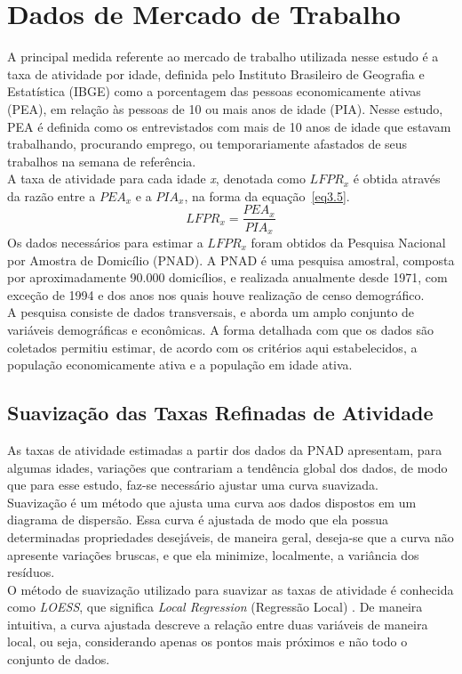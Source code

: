 \documentclass[12pt, 						%
			openright, 					%
			twoside,					%
			a4paper,x					%
			english,					%
			brazil]{abntex2}				%
\begin{document}
 	\section{Dados de Mercado de Trabalho \label{sec3.2}}
	A principal medida referente ao mercado de trabalho utilizada nesse estudo é a taxa de atividade por idade, definida pelo Instituto Brasileiro de Geografia e Estatística (IBGE) como a porcentagem das pessoas economicamente ativas (PEA), em relação às pessoas de 10 ou mais anos de idade (PIA). Nesse estudo, PEA é definida como os entrevistados com mais de 10 anos de idade que estavam trabalhando, procurando emprego, ou temporariamente afastados de seus trabalhos na semana de referência. \\
	A taxa de atividade para cada idade \textit{x}, denotada como $LFPR_{x}$ é obtida através da razão entre a $PEA_{x}$ e a $PIA_{x}$, na forma da equação~\ref{eq3.5}.
	\begin{equation} \label{eq3.5}
		LFPR_{x} = \dfrac{PEA_{x}}{PIA_{x}}
	\end{equation}
	Os dados necessários para estimar a $LFPR_{x}$ foram obtidos da Pesquisa Nacional por Amostra de Domicílio (PNAD). A PNAD é uma pesquisa amostral, composta por aproximadamente 90.000 domicílios, e realizada anualmente desde 1971, com exceção de 1994 e dos anos nos quais houve realização de censo demográfico. \\
	A pesquisa consiste de dados transversais, e aborda um amplo conjunto de variáveis demográficas e econômicas. A forma detalhada com que os dados são coletados permitiu estimar, de acordo com os critérios aqui estabelecidos, a população economicamente ativa e a população em idade ativa. 
		\subsection{Suavização das Taxas Refinadas de Atividade \label{sec3.2.1}}
		As taxas de atividade estimadas a partir dos dados da PNAD apresentam, para algumas idades, variações que contrariam a tendência global dos dados, de modo que para esse estudo, faz-se necessário ajustar uma curva suavizada.\\
		Suavização é um método que ajusta uma curva aos dados dispostos em um diagrama de dispersão. Essa curva é ajustada de modo que ela possua determinadas propriedades desejáveis, de maneira geral, deseja-se que a curva não apresente variações bruscas, e que ela minimize, localmente, a variância dos resíduos.\\
		O método de suavização utilizado para suavizar as taxas de atividade é conhecida como \textit{LOESS}, que significa \textit{Local Regression} (Regressão Local) \cite{cleveland1979robust, cleveland1988locally}. De maneira intuitiva, a curva ajustada descreve a relação entre duas variáveis de maneira local, ou seja, considerando apenas os pontos mais próximos e não todo o conjunto de dados.
\end{document}
